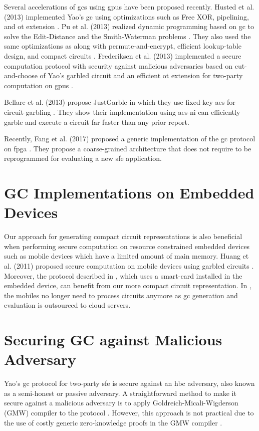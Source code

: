 Several accelerations of \acrshort{gc}s using \acrshort{gpu}s have been proposed recently.
Husted et al. (2013) implemented Yao's \acrshort{gc} using optimizations such as Free XOR, pipelining, and \acrshort{ot} extension \cite{husted2013gpu}.
Pu et al. (2013) realized dynamic programming based on \acrshort{gc} to solve the Edit-Distance and the Smith-Waterman problems \cite{pu2013computing}.
They also used the same optimizations as \cite{husted2013gpu} along with permute-and-encrypt, efficient lookup-table design, and compact circuits \cite{pu2013computing}.
Frederiksen et al. (2013) implemented a secure computation protocol with security against malicious adversaries based on cut-and-choose of Yao's garbled circuit and an efficient \acrshort{ot} extension for two-party computation on \acrshort{gpu}s \cite{frederiksen2013fast}.

Bellare et al. (2013) propose JustGarble in which they use fixed-key \acrshort{aes} for circuit-garbling \cite{bellare2013efficient}.
They show their implementation using \acrshort{aes-ni} can efficiently garble and execute a circuit far faster than any prior report.

Recently, Fang et al. (2017) proposed a generic implementation of the \acrshort{gc} protocol on \acrshort{fpga} \cite{fang2017secure}.
They propose a coarse-grained architecture that does not require to be reprogrammed for evaluating a new \acrshort{sfe} application.

\section{GC Implementations on Embedded Devices} \label{sec:related-embedded}
Our approach for generating compact circuit representations is also beneficial when performing secure computation on resource constrained embedded devices such as mobile devices which have a limited amount of main memory.
Huang et al. (2011) proposed secure computation on mobile devices using garbled circuits \cite{huang2011privacy}.
Moreover, the protocol described in \cite{demmler2014ad}, which uses a smart-card installed in the embedded device, can benefit from our more compact circuit representation.
In \cite{carter2016secure, carter2014whitewash}, the mobiles no longer need to process circuits anymore as \acrshort{gc} generation and evaluation is outsourced to cloud servers.

\section{Securing GC against Malicious Adversary}\label{sec:related-malicious}
Yao's \acrshort{gc} protocol for two-party \acrshort{sfe} is secure against an \acrshort{hbc} adversary, also known as a semi-honest or passive adversary.
A straightforward method to make it secure against a malicious adversary is to apply Goldreich-Micali-Wigderson (GMW) compiler to the protocol \cite{goldreich1987play}.
However, this approach is not practical due to the use of costly generic zero-knowledge proofs in the GMW compiler \cite{lindell2007efficient}.

